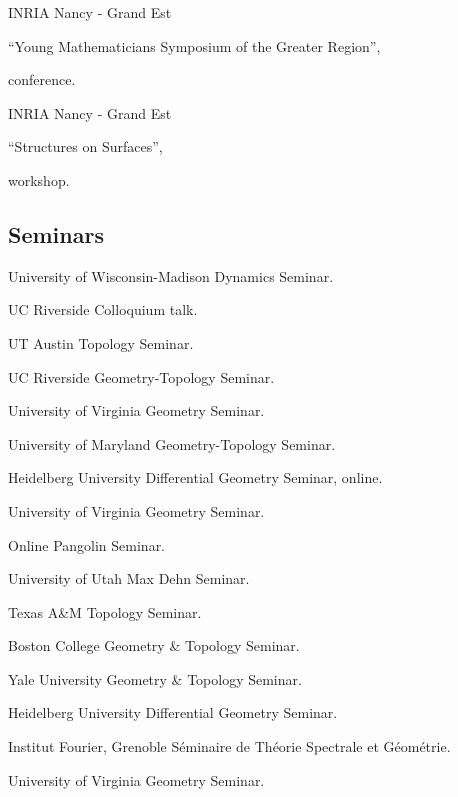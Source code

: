 {INRIA Nancy - Grand Est}
{``Young Mathematicians Symposium of the Greater Region'', \begin{footnotesize}
		conference.
\end{footnotesize}}
{}

{INRIA Nancy - Grand Est}
{``Structures on Surfaces'', \begin{footnotesize}
		workshop.
\end{footnotesize}}
{}

\subsection{Seminars}

{University of Wisconsin-Madison}
{Dynamics Seminar.}
{}

{UC Riverside}
{Colloquium talk.}
{}

{UT Austin}
{Topology Seminar.}
{}

{UC Riverside}
{Geometry-Topology Seminar.}
{}

{University of Virginia}
{Geometry Seminar.}
{}

{University of Maryland}
{Geometry-Topology Seminar.}
{}

{Heidelberg University}
{Differential Geometry Seminar, online.}
{}

{University of Virginia}
{Geometry Seminar.}
{}

{Online}
{Pangolin Seminar.}
{}

{University of Utah}
{Max Dehn Seminar.}
{}

{Texas A\&M}
{Topology Seminar.}
{}

{Boston College}
{Geometry \& Topology Seminar.}
{}

{Yale University}
{Geometry \& Topology Seminar.}
{}

{Heidelberg University}
{Differential Geometry Seminar.}
{}

{Institut Fourier, Grenoble}
{S\'eminaire de Th\'eorie Spectrale et G\'eom\'etrie.}
{}

{University of Virginia}
{Geometry Seminar.}
{}


